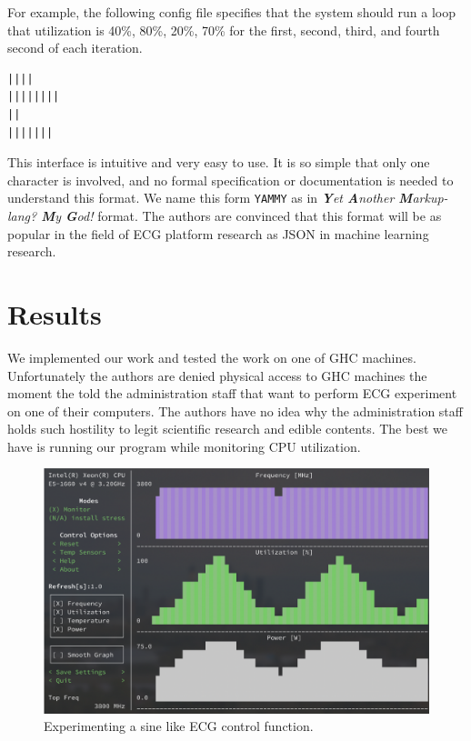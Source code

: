 \documentclass[conference]{IEEEtran}
\begin{document}
For example, the following config file specifies that the system should run a loop that utilization is
40\%, 80\%, 20\%, 70\%  for the first, second, third, and fourth second of each iteration.

\begin{verbatim}
||||
||||||||
||
|||||||
\end{verbatim}

This interface is intuitive and very easy to use. It is so simple that only one character is involved, and
no formal specification or documentation is needed to understand this format. We name this form \texttt{YAMMY} as in
\textit{\textbf{Y}et \textbf{A}nother \textbf{M}arkup-lang? \textbf{M}y \textbf{G}od!} format. The authors are 
convinced that this format will be as popular in the field of ECG platform research as JSON in machine learning research.

\section{Results}

We implemented our work and tested the work on one of GHC machines. Unfortunately the authors are denied physical access to
GHC machines the moment the told the administration staff that want to perform ECG experiment on one of their computers. The 
authors have no idea why the administration staff holds such hostility to legit scientific research and edible contents. The 
best we have is running our program while monitoring CPU utilization. 

\begin{figure}[htbp]
\centerline{\includegraphics[width=\linewidth]{fig/result.png}}
\caption{Experimenting a sine like ECG control function.}
\end{figure}
\end{document}
